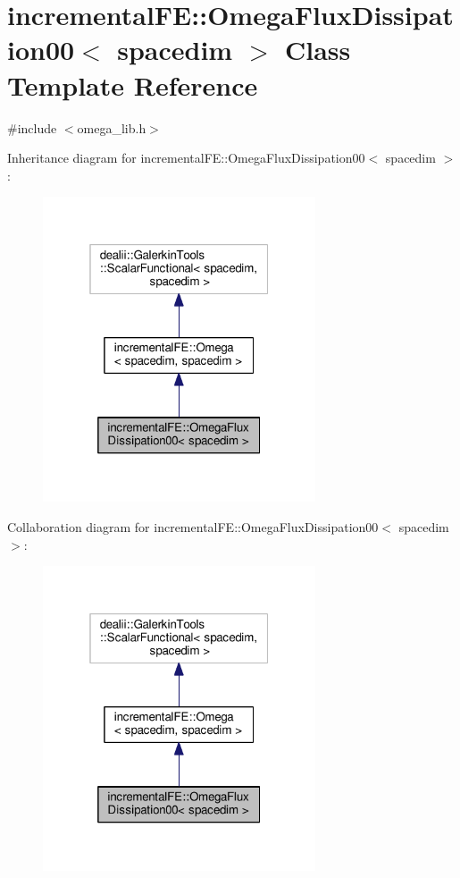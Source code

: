 \hypertarget{classincremental_f_e_1_1_omega_flux_dissipation00}{}\section{incremental\+FE\+:\+:Omega\+Flux\+Dissipation00$<$ spacedim $>$ Class Template Reference}
\label{classincremental_f_e_1_1_omega_flux_dissipation00}


{\ttfamily \#include $<$omega\+\_\+lib.\+h$>$}



Inheritance diagram for incremental\+FE\+:\+:Omega\+Flux\+Dissipation00$<$ spacedim $>$\+:\nopagebreak
\begin{figure}[H]
\begin{center}
\leavevmode
\includegraphics[width=229pt]{classincremental_f_e_1_1_omega_flux_dissipation00__inherit__graph}
\end{center}
\end{figure}


Collaboration diagram for incremental\+FE\+:\+:Omega\+Flux\+Dissipation00$<$ spacedim $>$\+:\nopagebreak
\begin{figure}[H]
\begin{center}
\leavevmode
\includegraphics[width=229pt]{classincremental_f_e_1_1_omega_flux_dissipation00__coll__graph}
\end{center}
\end{figure}
